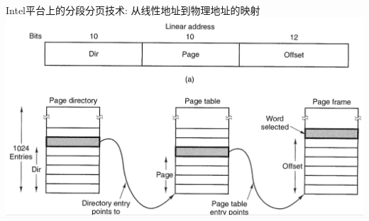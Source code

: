 \documentclass[xcolor=svgnames]{beamer}
\begin{document}
\begin{CJK*}{UTF8}{gbsn}
\begin{frame}{Intel平台上的分段分页技术: 从线性地址到物理地址的映射}
\includegraphics[width=1.0\textwidth]{pmap.png}
\end{frame}

\end{CJK*}
\end{document}
